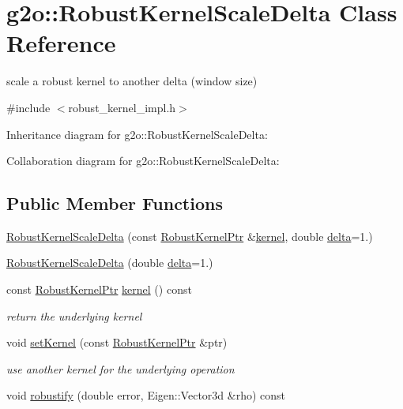 \hypertarget{classg2o_1_1RobustKernelScaleDelta}{}\section{g2o\+:\+:Robust\+Kernel\+Scale\+Delta Class Reference}
\label{classg2o_1_1RobustKernelScaleDelta}


scale a robust kernel to another delta (window size)  




{\ttfamily \#include $<$robust\+\_\+kernel\+\_\+impl.\+h$>$}



Inheritance diagram for g2o\+:\+:Robust\+Kernel\+Scale\+Delta\+:


Collaboration diagram for g2o\+:\+:Robust\+Kernel\+Scale\+Delta\+:
\subsection*{Public Member Functions}
\begin{DoxyCompactItemize}
\item 
\hyperlink{classg2o_1_1RobustKernelScaleDelta_acffeae7f685e69018f5b0222155a6eb2}{Robust\+Kernel\+Scale\+Delta} (const \hyperlink{namespaceg2o_a0802a5e01a6b1861ae01013220dec6ac}{Robust\+Kernel\+Ptr} \&\hyperlink{classg2o_1_1RobustKernelScaleDelta_a84185732ac179a67e10995a657cebe59}{kernel}, double \hyperlink{classg2o_1_1RobustKernel_a8c94f88f5c97f47c519a9adb44b4da36}{delta}=1.)
\item 
\hyperlink{classg2o_1_1RobustKernelScaleDelta_a537a88b2ff5432fb9e1ad2aaa85f60b9}{Robust\+Kernel\+Scale\+Delta} (double \hyperlink{classg2o_1_1RobustKernel_a8c94f88f5c97f47c519a9adb44b4da36}{delta}=1.)
\item 
const \hyperlink{namespaceg2o_a0802a5e01a6b1861ae01013220dec6ac}{Robust\+Kernel\+Ptr} \hyperlink{classg2o_1_1RobustKernelScaleDelta_a84185732ac179a67e10995a657cebe59}{kernel} () const 
\begin{DoxyCompactList}\small\item\em return the underlying kernel \end{DoxyCompactList}\item 
void \hyperlink{classg2o_1_1RobustKernelScaleDelta_a3bcc51d0cf3127e8c0431d1cddc1c75b}{set\+Kernel} (const \hyperlink{namespaceg2o_a0802a5e01a6b1861ae01013220dec6ac}{Robust\+Kernel\+Ptr} \&ptr)
\begin{DoxyCompactList}\small\item\em use another kernel for the underlying operation \end{DoxyCompactList}\item 
void \hyperlink{classg2o_1_1RobustKernelScaleDelta_aa0dd08d5175fac24ce96b1efe08be67b}{robustify} (double error, Eigen\+::\+Vector3d \&rho) const 
\end{DoxyCompactItemize}

